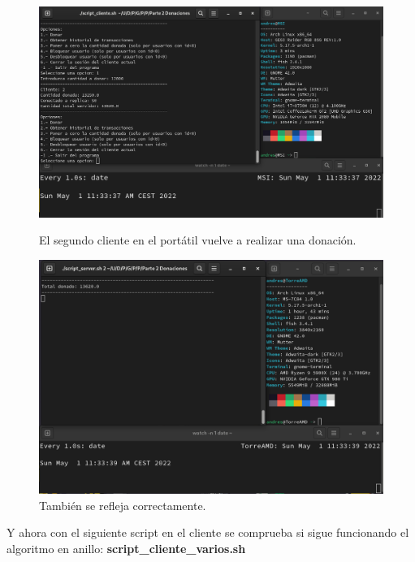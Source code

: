 \documentclass{article}
\begin{document}
\begin{figure}[H]
    \centering
    \begin{minipage}[H]{0.45\textwidth}
        \centering
        \includegraphics[width=\textwidth]{imagenes/multiples ordenadores/Cliente/Screenshot from 2022-05-01 11-33-44.png}
        \caption{El segundo cliente en el portátil vuelve a realizar una donación.}
    \end{minipage}
    \hfill
    \begin{minipage}[H]{0.45\textwidth}
        \centering
        \includegraphics[width=\textwidth]{imagenes/multiples ordenadores/Servidor/Screenshot from 2022-05-01 11-33-44.png}
        \caption{También se refleja correctamente.}
    \end{minipage}
\end{figure}

Y ahora con el siguiente script en el cliente se comprueba si sigue funcionando el algoritmo en anillo: \textbf{script\_cliente\_varios.sh}
\end{document}
